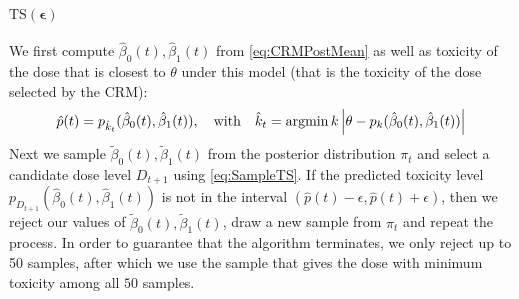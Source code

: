 



\paragraph{$\bm{\mathrm{TS}(\epsilon)}$}  We first compute $\hat\beta_0(t),\hat{\beta}_1(t)$ from \eqref{eq:CRMPostMean} as well as toxicity of the dose that is closest to $\theta$ under this model (that is the toxicity of the dose selected by the CRM): 
\[
\hat{p}(t) = p_{\hat k_{t}}(\hat\beta_0(t),\hat\beta_1(t)), \ \ \
\text{with} \ \ \ \hat k_{t} =\operatorname*{argmin}{k}\left|\theta - p_k(\hat\beta_0(t),\hat\beta_1(t))\right| 
\]
Next we sample $\tilde \beta_0(t), \tilde{\beta}_1(t)$ from the posterior distribution $\pi_t$
and select a candidate dose level $D_{t+1}$ using \eqref{eq:SampleTS}.
If the predicted toxicity level $p_{D_{t+1}}(\hat\beta_0(t),\hat{\beta}_1(t))$ is not in the
interval $(\hat{p}(t)-\epsilon, \hat{p}(t)+\epsilon)$, then we reject
our values of $\tilde\beta_0(t),\tilde{\beta}_1(t)$, draw a new sample from $\pi_t$ and repeat the process. 
In order to guarantee that the algorithm terminates, we only reject up to
50 samples, after which we use the sample that gives the dose with minimum toxicity among all $50$ samples.

